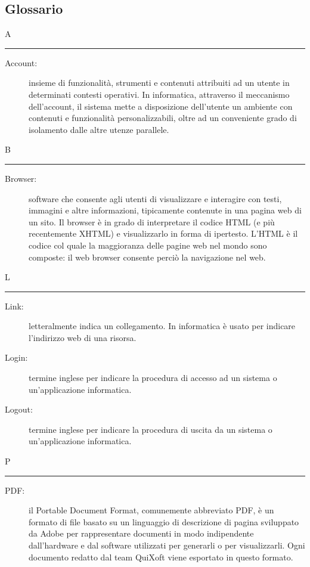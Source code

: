 \documentclass[11pt,a4paper]{article}
\begin{document}
\subsection{Glossario}
\flushleft \Huge A \bigskip
\hrule
\smallskip
\normalsize
\begin{description}
	\item[Account:] insieme di funzionalità, strumenti e contenuti attribuiti ad un utente in determinati contesti operativi. In informatica, attraverso il meccanismo dell'account, il sistema mette a disposizione dell'utente un ambiente con contenuti e funzionalità personalizzabili, oltre ad un conveniente grado di isolamento dalle altre utenze parallele.
\end{description}
\bigskip
\Huge B \bigskip
\hrule
\smallskip
\normalsize
\begin{description}
	\item[Browser:] software che consente agli utenti di visualizzare e interagire con testi, immagini e altre informazioni, tipicamente contenute in una pagina web di un sito. Il browser è in grado di interpretare il codice HTML (e più recentemente XHTML) e visualizzarlo in forma di ipertesto. L'HTML è il codice col quale la maggioranza delle pagine web nel mondo sono composte: il web browser consente perciò la navigazione nel web.
\end{description}
\bigskip
\Huge L \bigskip
\hrule
\smallskip
\normalsize
\begin{description}
	\item[Link:] letteralmente indica un collegamento. In informatica è usato per indicare l'indirizzo web di una risorsa.
	\item[Login:] termine inglese per indicare la procedura di accesso ad un sistema o un'applicazione informatica.
	\item[Logout:] termine inglese per indicare la procedura di uscita da un sistema o un'applicazione informatica.
\end{description}
\bigskip
\Huge P \bigskip
\hrule
\smallskip
\normalsize
\begin{description}
	\item[PDF:] il Portable Document Format, comunemente abbreviato PDF, è un formato di file basato su un linguaggio di descrizione di pagina sviluppato da Adobe per rappresentare documenti in modo indipendente dall'hardware e dal software utilizzati per generarli o per visualizzarli. Ogni documento redatto dal team QuiXoft viene esportato in questo formato.
\end{description}
\end{document}
